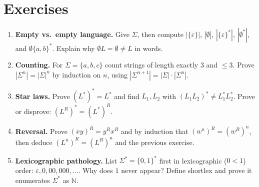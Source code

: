 \section{Exercises}
\label{sec:ch01-exercises}
\begin{enumerate}[label=E1.\arabic*, leftmargin=*, itemsep=0.8em]
\item \textbf{Empty vs.\ empty language.} Give $\Sigma$, then compute $|\{\varepsilon\}|$, $|\emptyset|$, $|\{\varepsilon\}^*|$, $|\emptyset^*|$, and $\emptyset\{a,b\}^*$. Explain why $\emptyset L=\emptyset\neq L$ in words.
\item \textbf{Counting.} For $\Sigma=\{a,b,c\}$ count strings of length exactly $3$ and $\le3$. Prove $|\Sigma^n|=|\Sigma|^n$ by induction on $n$, using $|\Sigma^{n+1}|=|\Sigma|\cdot|\Sigma^n|$.
\item \textbf{Star laws.} Prove $(L^*)^*=L^*$ and find $L_1,L_2$ with $(L_1L_2)^*\neq L_1^*L_2^*$. Prove or disprove: $(L^R)^*=(L^*)^R$.
\item \textbf{Reversal.} Prove $(xy)^R=y^Rx^R$ and by induction that $(w^n)^R=(w^R)^n$, then deduce $(L^n)^R=(L^R)^n$ and the previous exercise.
\item \textbf{Lexicographic pathology.} List $\Sigma^*=\{0,1\}^*$ first in lexicographic ($0<1$) order: $\varepsilon,0,00,000,\dots$. Why does $1$ never appear? Define shortlex and prove it enumerates $\Sigma^*$ as $\mathbb{N}$.
\end{enumerate}
